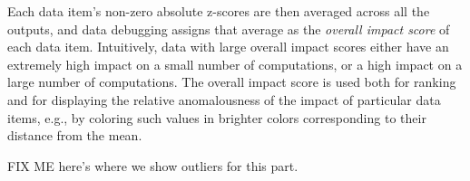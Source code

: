 Each data item's non-zero absolute z-scores are then averaged across
all the outputs, and data debugging assigns that average as
the \emph{overall impact score} of each data item.  Intuitively, data
with large overall impact scores either have an extremely high impact
on a small number of computations, or a high impact on a large number
of computations. The overall impact score is used both for ranking and
for displaying the relative anomalousness of the impact of particular
data items, e.g., by coloring such values in brighter colors
corresponding to their distance from the mean.

FIX ME here's where we show outliers for this part.



